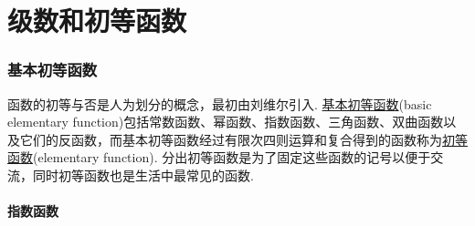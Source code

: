 

\part{级数和初等函数}
\setcounter{section}{0}

\section{基本初等函数}

函数的初等与否是人为划分的概念，最初由刘维尔引入. \uline{基本初等函数}(basic elementary function)包括常数函数、幂函数、指数函数、三角函数、双曲函数以及它们的反函数，而基本初等函数经过有限次四则运算和复合得到的函数称为\uline{初等函数}(elementary function). 分出初等函数是为了固定这些函数的记号以便于交流，同时初等函数也是生活中最常见的函数. 

\subsection{指数函数}

